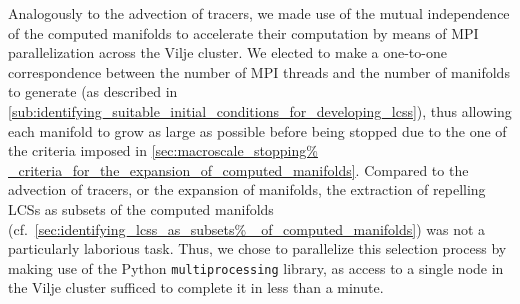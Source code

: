 Analogously to the advection of tracers, we made use of the mutual independence
of the computed manifolds to accelerate their computation by means of MPI
parallelization across the Vilje cluster. We elected to make a one-to-one
correspondence between the number of MPI threads and the number of manifolds to
generate (as described in
\cref{sub:identifying_suitable_initial_conditions_for_developing_lcss}),
thus allowing each manifold to grow as large as possible before being stopped
due to the one of the criteria imposed in \cref{sec:macroscale_stopping%
_criteria_for_the_expansion_of_computed_manifolds}. Compared to the advection
of tracers, or the expansion of manifolds, the extraction of repelling LCSs as
subsets of the computed manifolds (cf.\ \cref{sec:identifying_lcss_as_subsets%
_of_computed_manifolds}) was not a particularly laborious task. Thus, we chose
to parallelize this selection process by making use of the Python
\texttt{multiprocessing} library, as access to a single node in the Vilje
cluster sufficed to complete it in less than a minute.
